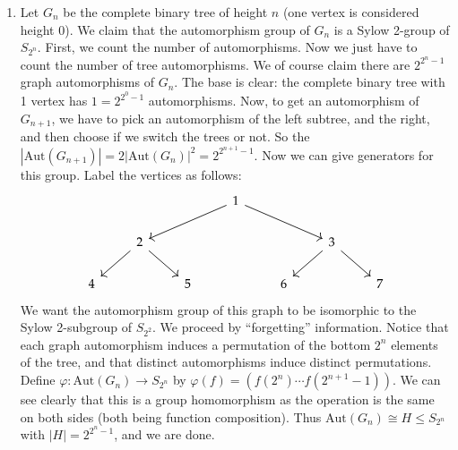 \documentclass[12pt]{article}
\theoremstyle{definitionstyle}
\def \cph{\varphi}
\begin{document}
\begin{enumerate}[leftmargin=\labelsep]
\begin{enumerate}
			\item Let $G_n$ be the complete binary tree of height $n$ (one vertex is considered height 0). We claim that the automorphism group of $G_n$ is a Sylow 2-group of $S_{2^n}$. First, we count the number of automorphisms. Now we just have to count the number of tree automorphisms. We of course claim there are $2^{2^n - 1}$ graph automorphisms of $G_n$. The base is clear: the complete binary tree with 1 vertex has $1 = 2^{2^0-1}$ automorphisms. Now, to get an automorphism of $G_{n+1}$, we have to pick an automorphism of the left subtree, and the right, and then choose if we switch the trees or not. So the $|\mathrm{Aut}(G_{n+1})| = 2|\mathrm{Aut}(G_{n})|^2 = 2^{2^{n+1}-1}$. Now we can give generators for this group. Label the vertices as follows:
			\[\begin{tikzcd}
				&&& 1 \\
				& 2 &&&& 3 \\
				4 && 5 && 6 && 7
				\arrow[from=1-4, to=2-2]
				\arrow[from=1-4, to=2-6]
				\arrow[from=2-2, to=3-1]
				\arrow[from=2-2, to=3-3]
				\arrow[from=2-6, to=3-5]
				\arrow[from=2-6, to=3-7]
			\end{tikzcd}\]
			We want the automorphism group of this graph to be isomorphic to the Sylow 2-subgroup of $S_{2^2}$. We proceed by ``forgetting'' information. Notice that each graph automorphism induces a permutation of the bottom $2^n$ elements of the tree, and that distinct automorphisms induce distinct permutations. Define $\cph: \mathrm{Aut}(G_n) \to S_{2^n}$ by $\cph(f) = (f(2^n) \cdots f(2^{n+1}-1))$. We can see clearly that this is a group homomorphism as the operation is the same on both sides (both being function composition). Thus $\mathrm{Aut}(G_n) \cong H \leq S_{2^{n}}$ with $|H| = 2^{2^n-1}$, and we are done.
		\end{enumerate}
	\end{enumerate}
\end{document}
